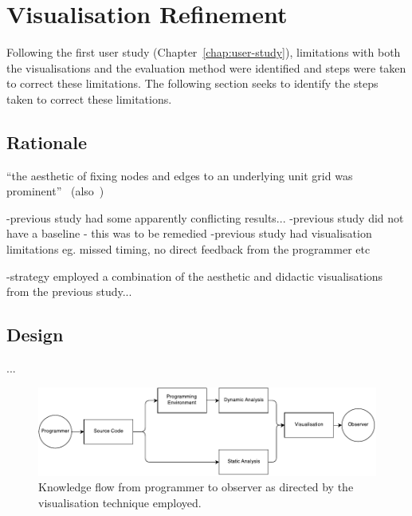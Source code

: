 
\chapter{Visualisation Refinement}
\label{chap:visualisation-refinement}

Following the first user study (Chapter~\ref{chap:user-study}), limitations with both the visualisations and the evaluation method were identified and steps were taken to correct these limitations. The following section seeks to identify the steps taken to correct these limitations.

\section{Rationale}


``the aesthetic of fixing nodes and edges to an underlying unit grid was prominent''~\cite{Purchase2014} (also~\cite{Purchase2001,Purchase1996})

-previous study had some apparently conflicting results...
-previous study did not have a baseline - this was to be remedied
-previous study had visualisation limitations eg. missed timing, no direct feedback from the programmer etc


-strategy employed a combination of the aesthetic and didactic visualisations from the previous study...

\section{Design}

\cite{Purchase1996}...

\begin{figure}
  \centering \includegraphics[width=\columnwidth]{../images/diagrams/knowledge-flow-refined.pdf}
  \caption{Knowledge flow from programmer to observer as directed by the visualisation technique employed.}
\label{fig:knowledge-flow-refined}
\end{figure}

